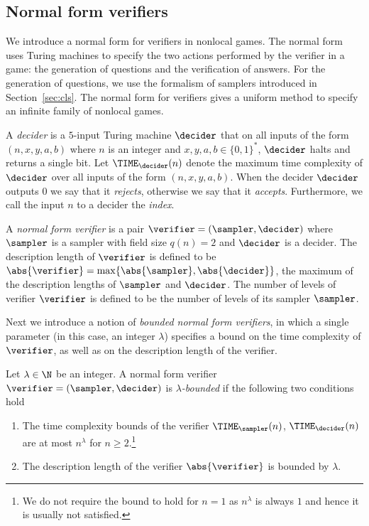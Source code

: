 \subsection{Normal form verifiers}
\label{sec:normal-form}

We introduce a normal form for verifiers in nonlocal games.
The normal form uses Turing machines to specify the two actions performed by the
verifier in a game: the generation of questions and the verification of answers.
For the generation of questions, we use the formalism of samplers introduced in
Section~\ref{sec:cls}.
The normal form for verifiers gives a uniform method to specify an infinite
family of nonlocal games.

\begin{definition}[Decider]
  \label{def:decider}
  A \emph{decider} is a $5$-input Turing machine $\decider$ that on all inputs
  of the form $(n,x,y,a,b)$ where $n$ is an integer and $x,y,a,b \in \{0,1\}^*$,
  $\decider$ halts and returns a single bit.
  Let $\TIME_\decider(n)$ denote the maximum time complexity of $\decider$ over
  all inputs of the form $(n,x,y,a,b)$.
	When the decider $\decider$ outputs $0$ we say that it \emph{rejects},
  otherwise we say that it \emph{accepts}.
  Furthermore, we call the input $n$ to a decider the \emph{index}.
\end{definition}

\begin{definition}
  \label{def:normal-ver}
  A \emph{normal form verifier} is a pair $\verifier = (\sampler, \decider)$
  where $\sampler$ is a sampler with field size $q(n) = 2$ and $\decider$ is a
  decider.
  The description length of $\verifier$ is defined to be $\abs{\verifier} =
  \max \{ \abs{\sampler} ,  \abs{\decider} \}$, the maximum of the description lengths of
  $\sampler$ and $\decider$.
  The number of levels of verifier $\verifier$ is defined to be the number of
  levels of its sampler $\sampler$.
\end{definition}

Next we introduce a notion of \emph{bounded normal form
  verifiers}, in which a single parameter (in this case, an integer $\lambda$)
specifies a bound on the time complexity of $\verifier$, as well as on the
description length of the verifier.

\begin{definition}
  \label{def:lambda}
  Let $\lambda \in \N$ be an integer.
  A normal form verifier $\verifier = (\sampler, \decider)$ is
  \emph{$\lambda$-bounded} if the following two conditions hold
  \begin{enumerate}
  \item The time complexity bounds of the verifier $\TIME_\sampler(n)$,
    $\TIME_\decider(n)$ are at most $n^\lambda$ for $n \ge 2$.\footnote{We do
      not require the bound to hold for $n=1$ as $n^\lambda$ is always $1$ and
      hence it is usually not satisfied.
    }
  \item The description length of the verifier $\abs{\verifier}$ is bounded by $\lambda$.
  \end{enumerate}
\end{definition}


